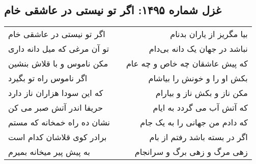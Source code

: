 \begin{center}
\section*{غزل شماره ۱۴۹۵: اگر تو نیستی در عاشقی خام}
\label{sec:1495}
\begin{longtable}{l p{0.5cm} r}
اگر تو نیستی در عاشقی خام
&&
بیا مگریز از یاران بدنام
\\
تو آن مرغی که میل دانه داری
&&
نباشد در جهان یک دانه بی‌دام
\\
مکن ناموس و با قلاش بنشین
&&
که پیش عاشقان چه خاص و چه عام
\\
اگر ناموس راه تو بگیرد
&&
بکش او را و خونش را بیاشام
\\
که این سودا هزاران ناز دارد
&&
مکن ناز و بکش ناز و بیارام
\\
حریفا اندر آتش صبر می کن
&&
که آتش آب می گردد به ایام
\\
نشان ده راه خمخانه که مستم
&&
که دادم من جهانی را به یک جام
\\
برادر کوی قلاشان کدام است
&&
اگر در بسته باشد رفتم از بام
\\
به پیش پیر میخانه بمیرم
&&
زهی مرگ و زهی برگ و سرانجام
\\
\end{longtable}
\end{center}
